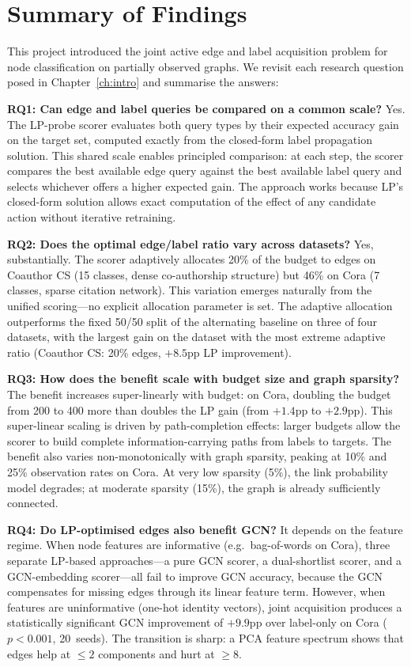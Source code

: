 \documentclass[12pt,a4paper,oneside]{report}
\begin{document}
\section{Summary of Findings}

This project introduced the joint active edge and label acquisition problem for node classification on partially observed graphs. We revisit each research question posed in Chapter~\ref{ch:intro} and summarise the answers:

\textbf{RQ1: Can edge and label queries be compared on a common scale?} Yes. The LP-probe scorer evaluates both query types by their expected accuracy gain on the target set, computed exactly from the closed-form label propagation solution. This shared scale enables principled comparison: at each step, the scorer compares the best available edge query against the best available label query and selects whichever offers a higher expected gain. The approach works because LP's closed-form solution allows exact computation of the effect of any candidate action without iterative retraining.

\textbf{RQ2: Does the optimal edge/label ratio vary across datasets?} Yes, substantially. The scorer adaptively allocates 20\% of the budget to edges on Coauthor CS (15 classes, dense co-authorship structure) but 46\% on Cora (7 classes, sparse citation network). This variation emerges naturally from the unified scoring---no explicit allocation parameter is set. The adaptive allocation outperforms the fixed 50/50 split of the alternating baseline on three of four datasets, with the largest gain on the dataset with the most extreme adaptive ratio (Coauthor CS: 20\% edges, $+8.5$pp LP improvement).

\textbf{RQ3: How does the benefit scale with budget size and graph sparsity?} The benefit increases super-linearly with budget: on Cora, doubling the budget from 200 to 400 more than doubles the LP gain (from $+1.4$pp to $+2.9$pp). This super-linear scaling is driven by path-completion effects: larger budgets allow the scorer to build complete information-carrying paths from labels to targets. The benefit also varies non-monotonically with graph sparsity, peaking at 10\% and 25\% observation rates on Cora. At very low sparsity (5\%), the link probability model degrades; at moderate sparsity (15\%), the graph is already sufficiently connected.

\textbf{RQ4: Do LP-optimised edges also benefit GCN?} It depends on the feature regime. When node features are informative (e.g.\ bag-of-words on Cora), three separate LP-based approaches---a pure GCN scorer, a dual-shortlist scorer, and a GCN-embedding scorer---all fail to improve GCN accuracy, because the GCN compensates for missing edges through its linear feature term. However, when features are uninformative (one-hot identity vectors), joint acquisition produces a statistically significant GCN improvement of $+9.9$pp over label-only on Cora ($p < 0.001$, 20~seeds). The transition is sharp: a PCA feature spectrum shows that edges help at $\leq 2$ components and hurt at $\geq 8$.
\end{document}

